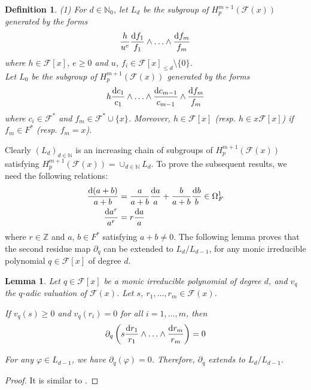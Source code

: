 \documentclass[times,10pt]{amsart}
\newcommand{\N}{\ensuremath{\mathbb{N}}}
\newcommand{\Z}{\ensuremath{\mathbb{Z}}}
\newcommand{\dd}{{\rm d}}
\newcommand{\F}{\ensuremath{\mathcal{F}}}
\renewcommand{\phi}{\varphi}
\newtheorem{defn}[thm]{Definition}%
\newtheorem{lemma}[thm]{Lemma}%
\begin{document}
  \begin{defn} (1) For $d\in \N_0$,  let $L_d$ be the subgroup of $H_p^{m+1}(\F(x))$ generated by the forms $$  \frac{h}{u^e} \frac{\dd f_1}{f_1}\wedge\ldots\wedge \frac{\dd f_m}{f_m}$$ where $ h\in \F[x]$, $e\geq 0$ and $u$, $f_i\in \F[x]_{\leq d}\setminus \{0\}$.\\

   Let $L_0$ be the subgroup of  $ H_p^{m+1}(\F(x))$ generated by the forms $$  h \frac{\dd c_1}{c_1}\wedge \ldots\wedge \frac{\dd c_{m-1}}{c_{m-1}}\wedge \frac{\dd f_m}{f_m}$$ where $ c_i\in \F^*$ and $ f_m\in \F^*\cup\{x\}$. Moreover,   $h\in \F[x]$  (resp. $h\in x\F[x]$)  if $f_m\in F^*$ (resp. $ f_m=x$). 
  \end{defn}

  Clearly $(L_d)_{d\in \N}$ is an increasing  chain of subgroups of $H_p^{m+1}(\F(x))$ {satisfying} ${ H_p^{m+1}(\F(x))=\cup_{d\in \N} L_d}$.   {To prove  the subsequent results, we need the following relations:  \begin{align}\label{de}\frac{\dd(a+b)}{a+b}&= \frac{a}{a+b}\frac{\dd a}{a}+\frac{b}{a+b}\frac{\dd b}{b}\in \Omega_F^1 \\ \label{ef1}\frac{\dd a^r}{a^r}&= r\frac{\dd a}{a}\end{align} 
where $r\in \Z$ and $a$, $b\in F^*$ satisfying $a+b\neq 0$.}
  The following  lemma proves that    the second residue map $ \partial_q$ can be extended to $L_d/L_{d-1}$, for any monic  irreducible polynomial $q\in \F[x]$  of degree $d$.  

   \begin{lemma}\label{lvalu}
       Let $q\in \F[x]$ be a monic irreducible polynomial of degree $d$, and  $v_q$ the $q$-adic valuation  of $\F(x)$. Let $ s$, $r_1,\ldots,r_m\in \F(x)$. 
       \vspace{1mm}
       
        If $v_q(s)\geq 0$ and $v_q(r_i)=0$ for all $i=1,\ldots,m$, then  $$  \partial_q\left( s\frac{\dd r_1}{r_1}\wedge \ldots\wedge \frac{\dd r_m}{r_m}\right)=0 $$

         For any $\phi\in L_{d-1}$, we have   $\partial_q(\phi)=0$. Therefore, $\partial_q$ extends to $L_d/ {L_{d-1}}$.
   \end{lemma}
   \begin{proof}
       It is similar to \cite[Lemma 3.4]{ex}.
   \end{proof}
\end{document}

